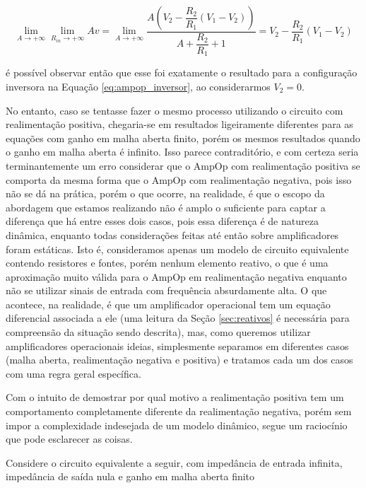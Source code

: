 \documentclass{article}
\numberwithin{equation}{section}
\let\dfr\dfrac
\begin{document}
\begin{equation}
    \lim_{A\to+\infty}\lim_{R_{in}\to+\infty}Av = \lim_{A\to+\infty} \dfr{A\left(V_2-\dfr{R_2}{R_1}\left(V_1-V_2\right)\right)}{A+\dfr{R_2}{R_1}+1} = V_2-\dfr{R_2}{R_1}\left(V_1-V_2\right)
\end{equation}

\noindent é possível observar então que esse foi exatamente o resultado para a configuração inversora na Equação \eqref{eq:ampop_inversor}, ao considerarmos $V_2 = 0$.

\vspace{5mm}

No entanto, caso se tentasse fazer o mesmo processo utilizando o circuito com realimentação positiva, chegaria-se em resultados ligeiramente diferentes para as equações com ganho em malha aberta finito, porém os mesmos resultados quando o ganho em malha aberta é infinito. Isso parece contraditório, e com certeza seria terminantemente um erro considerar que o AmpOp com realimentação positiva se comporta da mesma forma que o AmpOp com realimentação negativa, pois isso não se dá na prática, porém o que ocorre, na realidade, é que o escopo da abordagem que estamos realizando não é amplo o suficiente para captar a diferença que há entre esses dois casos, pois essa diferença é de natureza dinâmica, enquanto todas considerações feitas até então sobre amplificadores foram estáticas. Isto é, consideramos apenas um modelo de circuito equivalente contendo resistores e fontes, porém nenhum elemento reativo, o que é uma aproximação muito válida para o AmpOp em realimentação negativa enquanto não se utilizar sinais de entrada com frequência absurdamente alta. O que acontece, na realidade, é que um amplificador operacional tem um equação diferencial associada a ele (uma leitura da Seção \ref{sec:reativos} é necessária para compreensão da situação sendo descrita), mas, como queremos utilizar amplificadores operacionais ideias, simplesmente separamos em diferentes casos (malha aberta, realimentação negativa e positiva) e tratamos cada um dos casos com uma regra geral específica.

Com o intuito de demostrar por qual motivo a realimentação positiva tem um comportamento completamente diferente da realimentação negativa, porém sem impor a complexidade indesejada de um modelo dinâmico, segue um raciocínio que pode esclarecer as coisas.

\vspace{5mm}

Considere o circuito equivalente a seguir, com impedância de entrada infinita, impedância de saída nula e ganho em malha aberta finito
\end{document}
